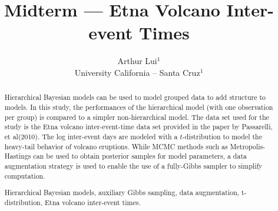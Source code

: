 \documentclass{../../tex_template/asaproc}
\title{Midterm --- Etna Volcano Inter-event Times}
\author{
  Arthur Lui$^1$\\
  University California -- Santa Cruz$^1$\\
}
\begin{document}
\maketitle
\begin{abstract}
Hierarchical Bayesian models can be used to model grouped data to add structure
to models. In this study, the performances of the hierarchical model (with one
observation per group) is compared to a simpler non-hierarchical model. The
data set used for the study is the Etna volcano inter-event-time data set
provided in the paper by Passarelli, et al(2010). The log inter-event days are
modeled with a $t$-distribution to model the heavy-tail behavior of volcano
eruptions. While MCMC methods such as Metropolis-Hastings can be used to obtain
posterior samples for model parameters, a data augmentation strategy is used to
enable the use of a fully-Gibbs sampler to simplify computation.

\begin{keywords}
Hierarchical Bayesian models, auxiliary Gibbs sampling, data augmentation,
t-distribution, Etna volcano inter-event times.
\end{keywords}
\end{abstract}
\end{document}
